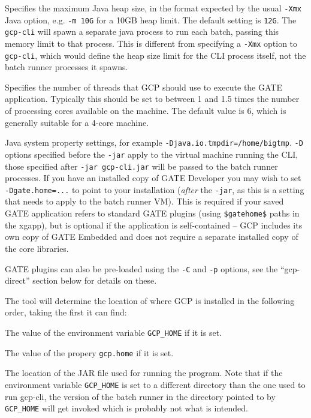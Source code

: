 \bde
\item[-m] Specifies the maximum Java heap size, in the format expected by the
  usual \verb!-Xmx! Java option, e.g. \verb!-m 10G! for a 10GB heap limit.  The
  default setting is \verb!12G!.  The \verb!gcp-cli! will spawn a separate java
  process to run each batch, passing this memory limit to that process.  This
  is different from specifying a \verb!-Xmx! option to \verb!gcp-cli!, which
  would define the heap size limit for the CLI process itself, not the batch
  runner processes it spawns.
\item[-t] Specifies the number of threads that GCP should use to execute the
  GATE application.  Typically this should be set to between 1 and 1.5 times
  the number of processing cores available on the machine.  The default value
  is 6, which is generally suitable for a 4-core machine.
\item[-D] Java system property settings, for example
  \verb!-Djava.io.tmpdir=/home/bigtmp!.  \verb!-D! options specified before the
  \verb!-jar! apply to the virtual machine running the CLI, those specified
  after \verb!-jar gcp-cli.jar! will be passed to the batch runner processes.
  If you have an installed copy of GATE Developer you may wish to set
  \verb!-Dgate.home=...! to point to your installation (\emph{after} the
  \verb!-jar!, as this is a setting that needs to apply to the batch runner
  VM).  This is required if your saved GATE application refers to standard GATE
  plugins (using \verb!$gatehome$! paths in the xgapp), but is optional if the
  application is self-contained -- GCP includes its own copy of GATE Embedded
  and does not require a separate installed copy of the core libraries.
\ede

GATE plugins can also be pre-loaded using the \verb!-C! and \verb!-p! options,
see the ``gcp-direct'' section below for details on these.

The tool will determine the location of where GCP is installed in the 
following order, taking the first it can find:
\ben
\item The value of the environment variable \verb!GCP_HOME! if it is set.
\item The value of the propery  \verb!gcp.home! if it is set.
\item The location of the JAR file used for running the program.
\een
Note that if the environment variable \verb!GCP_HOME! is set to a different
directory than the one used to run gcp-cli, the version of 
the batch runner in the directory pointed to by \verb!GCP_HOME! will get invoked
which is probably not what is intended.

